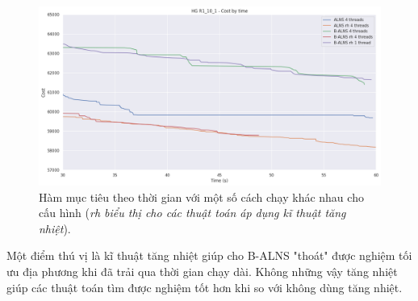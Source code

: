 \begin{figure}[H] %
  \centering %
  \includegraphics[width=1\textwidth]{figures/cost_time_R1_10_1_rh.png} 
  \caption{Hàm mục tiêu theo thời gian với một số cách chạy khác nhau cho cấu hình  (\textit{rh biểu thị cho các thuật toán áp dụng kĩ thuật tăng nhiệt}).} 
  \label{fig:reheat1}
\end{figure}

Một điểm thú vị là kĩ thuật tăng nhiệt giúp cho B-ALNS "thoát" được nghiệm tối ưu địa phương khi đã trải qua thời gian chạy dài. Không những vậy tăng nhiệt giúp các thuật toán tìm được nghiệm tốt hơn khi so với không dùng tăng nhiệt.